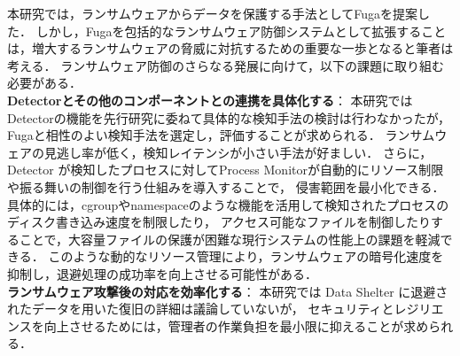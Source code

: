 
本研究では，ランサムウェアからデータを保護する手法としてFugaを提案した．
しかし，Fugaを包括的なランサムウェア防御システムとして拡張することは，増大するランサムウェアの脅威に対抗するための重要な一歩となると筆者は考える．
ランサムウェア防御のさらなる発展に向けて，以下の課題に取り組む必要がある．
\\
\textbf{Detectorとその他のコンポーネントとの連携を具体化する}：
本研究ではDetectorの機能を先行研究に委ねて具体的な検知手法の検討は行わなかったが，Fugaと相性のよい検知手法を選定し，評価することが求められる．
ランサムウェアの見逃し率が低く，検知レイテンシが小さい手法が好ましい．
% 
さらに，Detector が検知したプロセスに対してProcess Monitorが自動的にリソース制限や振る舞いの制御を行う仕組みを導入することで，
侵害範囲を最小化できる．具体的には，cgroupやnamespaceのような機能を活用して検知されたプロセスのディスク書き込み速度を制限したり，
アクセス可能なファイルを制御したりすることで，大容量ファイルの保護が困難な現行システムの性能上の課題を軽減できる．
このような動的なリソース管理により，ランサムウェアの暗号化速度を抑制し，退避処理の成功率を向上させる可能性がある．
\\
\textbf{ランサムウェア攻撃後の対応を効率化する}：
本研究では Data Shelter に退避されたデータを用いた復旧の詳細は議論していないが，
セキュリティとレジリエンスを向上させるためには，管理者の作業負担を最小限に抑えることが求められる．
